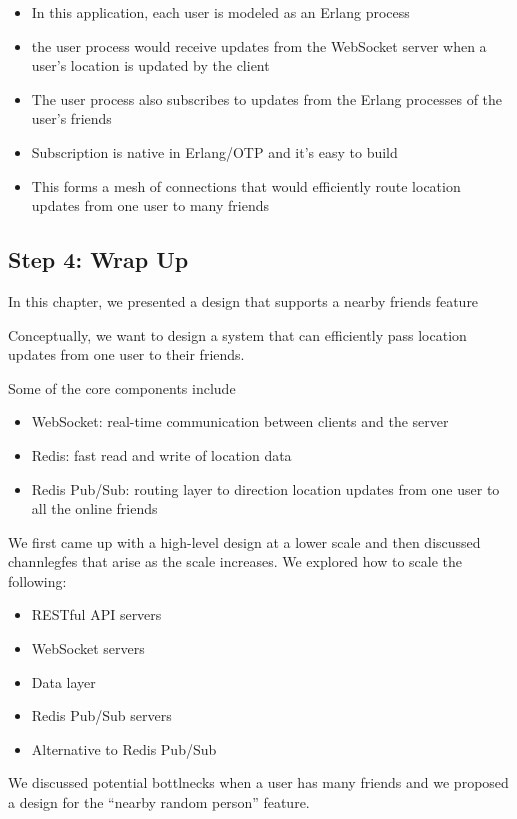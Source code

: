 \documentclass{report}
\theoremstyle{definition}
\let\oldsubsection\subsection
\renewcommand{\subsection}{\oldsubsection*}
\begin{document}
\begin{itemize}
\item
In this application, each user is modeled as an Erlang process
\item
the user process would receive updates from the WebSocket server when a user's location is updated by the client
\item
The user process also subscribes to updates from the Erlang processes of the user's friends
\item
Subscription is native in Erlang/OTP and it's easy to build
\item
This forms a mesh of connections that would efficiently route location updates from one user to many friends
\end{itemize}

\subsection{Step 4: Wrap Up}

In this chapter, we presented a design that supports a nearby friends feature

Conceptually, we want to design a system that can efficiently pass location updates from one user to their friends.

Some of the core components include

\begin{itemize}
\item
WebSocket: real-time communication between clients and the server
\item
Redis: fast read and write of location data
\item
Redis Pub/Sub: routing layer to direction location updates from one user to all the online friends
\end{itemize}

We first came up with a high-level design at a lower scale and then discussed channlegfes that arise as the scale increases. We explored how to scale the following:

\begin{itemize}
\item
RESTful API servers
\item
WebSocket servers
\item
Data layer
\item
Redis Pub/Sub servers
\item
Alternative to Redis Pub/Sub
\end{itemize}

We discussed potential bottlnecks when a user has many friends and we proposed a design for the ``nearby random person'' feature.
\end{document}
